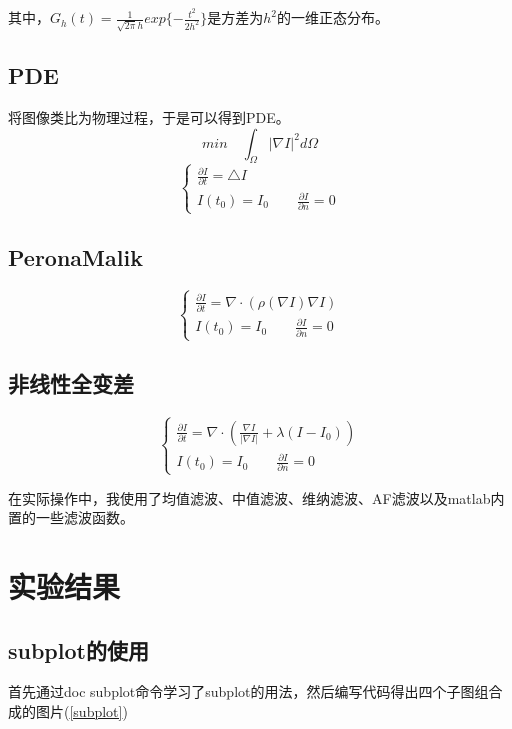 \documentclass[a4paper,left=2.5cm,right=2.5cm]{article}
\begin{document}
\begin{spacing}{1.6}
		其中，$G_h(t) = \frac{1}{\sqrt{2\pi}h}exp\{-\frac{t^2}{2h^2}\}$是方差为$h^2$的一维正态分布。
		\subsection{PDE}
		将图像类比为物理过程，于是可以得到PDE。
		\begin{equation}
		min \quad \int_{\Omega}\big|\nabla I\big|^2d\Omega
		\end{equation}
		\begin{equation}
		\left\{
		\begin{array}{l}
		\frac{\partial I}{\partial t} = \triangle I \\
		I(t_0) = I_0 \qquad \frac{\partial I}{\partial n} = 0
		\end{array}
		\right.
		\end{equation}
		\subsection{PeronaMalik}
		\begin{equation}
		\left\{
		\begin{array}{l}
		
		\frac{\partial I}{\partial t} = \nabla\cdot(\rho(\nabla I)\nabla I) \\
		I(t_0) = I_0 \qquad \frac{\partial I}{\partial n} = 0
		\end{array}
		\right.
		\end{equation}
		\subsection{非线性全变差}
		\begin{equation}
		\left\{
		\begin{array}{l}
		\frac{\partial I}{\partial t} = \nabla\cdot(\frac{\nabla I}{\big|\nabla I\big|} + \lambda(I-I_0)) \\
		I(t_0) = I_0 \qquad \frac{\partial I}{\partial n} = 0
		\end{array}
		\right.
		\end{equation}
		
		在实际操作中，我使用了均值滤波、中值滤波、维纳滤波、AF滤波以及matlab内置的一些滤波函数。
		\section{实验结果}
		\subsection{subplot的使用}
		首先通过doc subplot命令学习了subplot的用法，然后编写代码得出四个子图组合成的图片(\ref{subplot})
		

\end{spacing}
\end{document}
